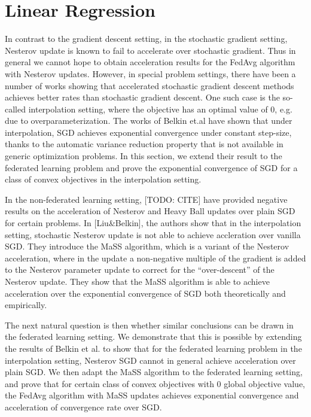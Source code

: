 


\section{Linear Regression}

In contrast to the gradient descent setting, in the stochastic gradient
setting, Nesterov update is known to fail to accelerate over stochastic
gradient. Thus in general we cannot hope to obtain acceleration results
for the FedAvg algorithm with Nesterov updates. However, in special
problem settings, there have been a number of works showing that accelerated
stochastic gradient descent methods achieves better rates than stochastic
gradient descent. One such case is the so-called interpolation setting,
where the objective has an optimal value of 0, e.g. due to overparameterization.
The works of Belkin et.al have shown that under interpolation, SGD
achieves exponential convergence under constant step-size, thanks
to the automatic variance reduction property that is not available
in generic optimization problems. In this section, we extend their
result to the federated learning problem and prove the exponential
convergence of SGD for a class of convex objectives in the interpolation
setting.

In the non-federated learning setting, {[}TODO: CITE{]} have provided
negative results on the acceleration of Nesterov and Heavy Ball updates
over plain SGD for certain problems. In {[}Liu\&Belkin{]}, the authors
show that in the interpolation setting, stochastic Nesterov update
is not able to achieve accleration over vanilla SGD. They introduce
the MaSS algorithm, which is a variant of the Nesterov acceleration,
where in the update a non-negative multiple of the gradient is added
to the Nesterov parameter update to correct for the ``over-descent''
of the Nesterov update. They show that the MaSS algorithm is able
to achieve acceleration over the exponential convergence of SGD both
theoretically and empirically.

The next natural question is then whether similar conclusions can
be drawn in the federated learning setting. We demonstrate that this
is possible by extending the results of Belkin et al. to show that
for the federated learning problem in the interpolation setting, Nesterov
SGD cannot in general achieve acceleration over plain SGD. We then
adapt the MaSS algorithm to the federated learning setting, and prove
that for certain class of convex objectives with 0 global objective
value, the FedAvg algorithm with MaSS updates achieves exponential
convergence and acceleration of convergence rate over SGD. 

